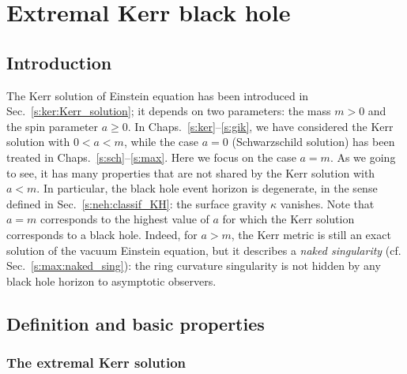 \chapter{Extremal Kerr black hole}
\label{s:exk}

\minitoc

\section{Introduction}

The Kerr solution of Einstein equation has been introduced in Sec.~\ref{s:ker:Kerr_solution};
it depends on two parameters: the mass $m > 0$ and the spin parameter
$a \geq 0$.
In Chaps.~\ref{s:ker}--\ref{s:gik}, we have considered the Kerr solution with $0<a<m$,
while the case $a=0$ (Schwarzschild solution) has been treated in Chaps.~\ref{s:sch}--\ref{s:max}.
Here we focus on the case $a=m$. As we going to see, it has many properties that are not
shared by the Kerr solution with $a<m$. In particular, the black hole event horizon is
degenerate, in the sense defined in Sec.~\ref{s:neh:classif_KH}: the surface gravity
$\kappa$ vanishes. Note that $a=m$ corresponds to the highest value of $a$
for which the Kerr solution corresponds to a black hole.
Indeed, for $a> m$, the Kerr metric is still an exact
solution of the vacuum Einstein equation, but it describes a \emph{naked singularity} (cf. Sec.~\ref{s:max:naked_sing}):
the ring curvature singularity is not hidden by any black hole horizon to asymptotic observers.



\section{Definition and basic properties}

\subsection{The extremal Kerr solution}

